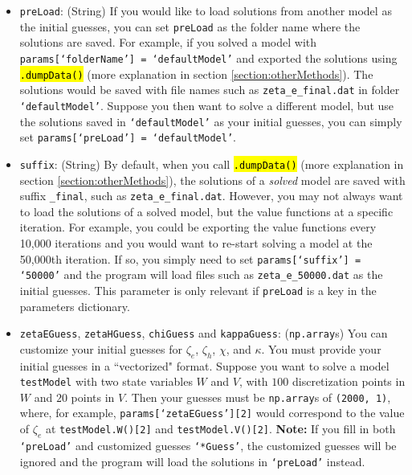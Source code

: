 \documentclass[12pt]{article}
\newcommand{\wealthSymbol}{$W$\xspace}
\newcommand{\stochasticVolSymbol}{$V$\xspace}
\newcommand{\wealthProg}{W}
\newcommand{\stochasticVolProg}{V}
\DeclareRobustCommand{\hlCODE}[1]{{\sethlcolor{backcolour}\hl{#1}}}
\begin{document}
\begin{itemize}
\item \texttt{preLoad}: (String) If you would like to load solutions from another model as the initial guesses, you can set \texttt{preLoad} as the folder name where the solutions are saved. For example, if you solved a model with \texttt{params[`folderName'] = `defaultModel'} and exported the solutions using \hlCODE{\texttt{.dumpData()}} (more explanation in section \ref{section:otherMethods}). The solutions would be saved with file names such as \texttt{zeta\_e\_final.dat} in folder \texttt{`defaultModel'}. Suppose you then want to solve a different model, but use the solutions saved in \texttt{`defaultModel'} as your initial guesses, you can simply \\set \texttt{params[`preLoad'] = `defaultModel'}.
\item \texttt{suffix}: (String) By default, when you call \hlCODE{\texttt{.dumpData()}} (more explanation in section \ref{section:otherMethods}), the solutions of a \textit{solved} model are saved with suffix \texttt{\_final}, such as \texttt{zeta\_e\_final.dat}. However, you may not always want to load the solutions of a solved model, but the value functions at a specific iteration. For example, you could be exporting the value functions every 10,000 iterations and you would want to re-start solving a model at the 50,000th iteration. If so, you simply need to set \texttt{params[`suffix'] = `50000'} and the program will load files such as \texttt{zeta\_e\_50000.dat} as the initial guesses. This parameter is only relevant if \texttt{preLoad} is a key in the parameters dictionary.
\item \texttt{zetaEGuess}, \texttt{zetaHGuess}, \texttt{chiGuess} and \texttt{kappaGuess}: (\texttt{np.array}s) You can customize your initial guesses for $\zeta_e$, $\zeta_h$, $\chi$, and $\kappa$. You must provide your initial guesses in a ``vectorized" format.  Suppose you want to solve a model \texttt{testModel} with two state variables \wealthSymbol and \stochasticVolSymbol, with $100$ discretization points in \wealthSymbol and $20$ points in \stochasticVolSymbol. Then your guesses must be \texttt{np.array}s of \texttt{(2000, 1)}, where, for example, \texttt{params[`zetaEGuess'][2]} would correspond to the value of $\zeta_e$ at \texttt{testModel.\wealthProg()[2]} and \texttt{testModel.\stochasticVolProg()[2]}. \textbf{Note:} If you fill in both \texttt{`preLoad'} and customized guesses \texttt{`*Guess'}, the customized guesses will be ignored and the program will load the solutions in \texttt{`preLoad'} instead.
\end{itemize}
\end{document}
